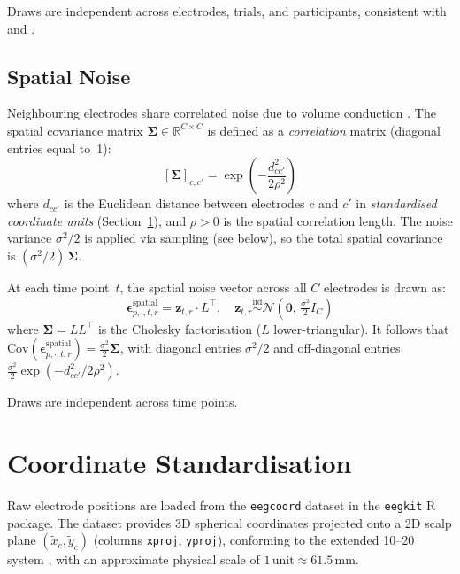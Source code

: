 \documentclass[12pt, a4paper]{article}
\begin{document}
Draws are independent across electrodes, trials, and participants,
consistent with \citet{Nalborczyk2025} and \citet{Sassenhagen2019}.

\subsection{Spatial Noise}\label{sec:spatial_noise}

Neighbouring electrodes share correlated noise due to volume conduction
\citep{NunezSrinivasan2006, Pernet2015}.
The spatial covariance matrix
$\boldsymbol{\Sigma} \in \mathbb{R}^{C \times C}$ is defined as a
\emph{correlation} matrix (diagonal entries equal to~1):
%
\begin{equation}\label{eq:sigma}
  [\boldsymbol{\Sigma}]_{c,c'}
  = \exp\!\left(-\frac{d_{cc'}^2}{2\rho^2}\right)
\end{equation}
%
where $d_{cc'}$ is the Euclidean distance between electrodes $c$ and
$c'$ in \emph{standardised coordinate units} (Section~\ref{sec:coords}),
and $\rho > 0$ is the spatial correlation length.
The noise variance $\sigma^2/2$ is applied via sampling (see below),
so the total spatial covariance is $(\sigma^2/2)\,\boldsymbol{\Sigma}$.

At each time point~$t$, the spatial noise vector across all $C$ electrodes
is drawn as:
%
\begin{equation}\label{eq:spatial_draw}
  \boldsymbol{\epsilon}^{\text{spatial}}_{p,\cdot,t,r}
  = \mathbf{z}_{t,r} \cdot L^\top, \quad
  \mathbf{z}_{t,r} \overset{\text{iid}}{\sim}
    \mathcal{N}\!\left(\mathbf{0},\, \tfrac{\sigma^2}{2} I_C\right)
\end{equation}
%
where $\boldsymbol{\Sigma} = L L^\top$ is the Cholesky factorisation
($L$ lower-triangular).
It follows that
$\mathrm{Cov}(\boldsymbol{\epsilon}^{\text{spatial}}_{p,\cdot,t,r})
= \frac{\sigma^2}{2}\boldsymbol{\Sigma}$,
with diagonal entries $\sigma^2/2$ and off-diagonal entries
$\frac{\sigma^2}{2}\exp(-d_{cc'}^2/2\rho^2)$.

Draws are independent across time points.

\section{Coordinate Standardisation}\label{sec:coords}

Raw electrode positions are loaded from the \texttt{eegcoord} dataset in the
\texttt{eegkit} R package.
The dataset provides 3D spherical coordinates projected onto a 2D scalp plane
$(\tilde{x}_c, \tilde{y}_c)$ (columns \texttt{xproj}, \texttt{yproj}),
conforming to the extended 10--20 system \citep{NunezSrinivasan2006},
with an approximate physical scale of $1\,\text{unit} \approx 61.5\,\text{mm}$.
\end{document}
